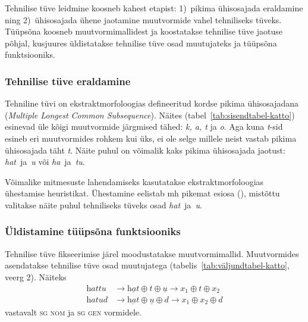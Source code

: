 \documentclass[12pt,a4paper]{article}
\newcommand{\vadja}[1]{\textit{#1}}
\newcommand{\msd}[1]{\textsc{#1}}
\begin{document}
Tehnilise tüve leidmine koosneb kahest etapist: 1)~pikima ühisosajada eraldamine ning 2)~ühisosajada ühene jaotamine muutvormide vahel tehniliseks tüveks. Tüüpsõna koosneb muutvormimallidest ja koostatakse tehnilise tüve jaotuse põhjal, kusjuures üldistatakse tehnilise tüve osad muutujateks ja tüüpsõna funktsiooniks.


\subsubsection{Tehnilise tüve eraldamine}

Tehniline tüvi on ekstraktmorfoloogias defineeritud kordse pikima ühisosajadana (\textit{Multiple Longest Common Subsequence}). %
Näites (tabel~\ref{tab:sisendtabel-katto}) esinevad üle kõigi muutvormide järgmised tähed: \vadja{k, a, t} ja \vadja{o}. Aga kuna \textit{t}-sid esineb eri muutvormides rohkem kui üks, ei ole selge millele neist vastab pikima ühisosajada täht \textit{t}.  Näite puhul on võimalik kaks pikima ühisosajada jaotust: \textit{hat}~ja~\textit{u} või \textit{ha}~ja~\textit{tu}.

Võimalike mitmesuste lahendamiseks kasutatakse ekstraktmorfoloogias ühestamise heuristikat. %
Ühestamine eelistab mh pikemat esiosa (\cite[33]{hulden_generalizing_2014}), mistõttu valitakse näite puhul tehniliseks tüveks osad \textit{hat}~ja~\textit{u}.


\subsubsection{Üldistamine tüüpsõna funktsiooniks}

Tehnilise tüve fikseerimise järel moodustatakse muutvormi\-mallid. Muutvormides asendatakse tehnilise tüve osad muutujatega (tabelis~\ref{tab:väljundtabel-katto}, veerg 2). Näiteks
\begin{align*}
  \textit{hattu} &\rightarrow \underline{\textit{hat}} \oplus \textit{t} \oplus \underline{\textit{u}} \rightarrow x_1 \oplus t \oplus x_2 \nonumber \\
  \textit{hatud} &\rightarrow \underline{\textit{hat}} \oplus \underline{\textit{u}} \oplus \textit{d} \rightarrow x_1 \oplus x_2 \oplus d \nonumber
\end{align*}
vastavalt \msd{sg nom} ja \msd{sg gen} vormidele.
\end{document}

